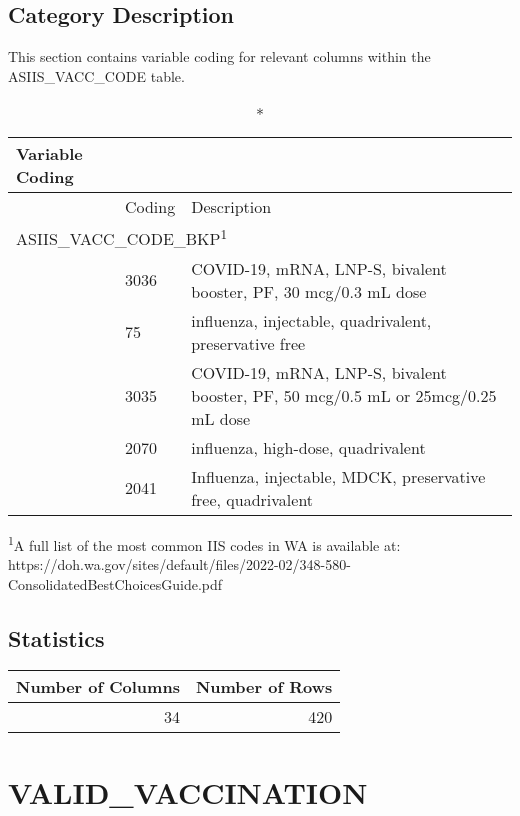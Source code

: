 \documentclass[
  letterpaper,
  DIV=11,
  numbers=noendperiod]{scrreprt}
\begin{document}
\hypertarget{category-description-51}{%
\section*{Category Description}\label{category-description-51}}

This section contains variable coding for relevant columns within the
ASIIS\_VACC\_CODE table.

\setlength{\LTpost}{0mm}
\begin{longtable}{l|ll}
\caption*{
{\large Variable Coding}
} \\ 
\toprule
\multicolumn{1}{l}{} & Coding & Description \\ 
\midrule
\multicolumn{3}{l}{ASIIS\_VACC\_CODE\_BKP\textsuperscript{1}} \\ 
\midrule
  & 3036 & COVID-19, mRNA, LNP-S, bivalent booster, PF, 30 mcg/0.3 mL dose \\ 
  & 75 & influenza, injectable, quadrivalent, preservative free \\ 
  & 3035 & COVID-19, mRNA, LNP-S, bivalent booster, PF, 50 mcg/0.5 mL or 25mcg/0.25 mL dose \\ 
  & 2070 & influenza, high-dose, quadrivalent \\ 
  & 2041 & Influenza, injectable, MDCK, preservative free, quadrivalent \\ 
\bottomrule
\end{longtable}
\begin{minipage}{\linewidth}
\textsuperscript{1}A full list of the most common IIS codes in WA is available at: https://doh.wa.gov/sites/default/files/2022-02/348-580-ConsolidatedBestChoicesGuide.pdf\\
\end{minipage}

\hypertarget{statistics-51}{%
\section*{Statistics}\label{statistics-51}}

\begin{longtable}{rr}
\toprule
Number of Columns & Number of Rows \\ 
\midrule
34 & 420 \\ 
\bottomrule
\end{longtable}

\hypertarget{valid_vaccination}{%
\chapter*{VALID\_VACCINATION}\label{valid_vaccination}}
\end{document}
